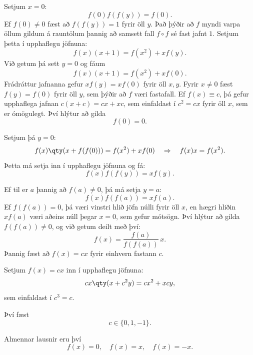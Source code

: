 Setjum $x = 0$:
\[
f(0) f(f(y)) = f(0).
\]
Ef $f(0) \neq 0$ fæst að $f(f(y)) = 1$ fyrir öll $y$.  
Það þýðir að $f$ myndi varpa öllum gildum á rauntölum þannig að samsett fall $f \circ f$ sé fast jafnt $1$.  
Setjum þetta í upphaflegu jöfnuna:
\[
f(x)(x + 1) = f(x^2) + x f(y).
\]
Við getum þá sett $y = 0$ og fáum
\[
f(x)(x + 1) = f(x^2) + x f(0).
\]
Frádráttur jafnanna gefur $x f(y) = x f(0)$ fyrir öll $x,y$. Fyrir $x \neq 0$ fæst $f(y) = f(0)$ fyrir öll $y$, sem þýðir að $f$ væri fastafall.  
Ef $f(x) \equiv c$, þá gefur upphaflega jafnan $c(x + c) = c x + x c$, sem einfaldast í $c^2 = c x$ fyrir öll $x$,  
sem er ómögulegt. Því hlýtur að gilda
\[
f(0) = 0.
\]

Setjum þá $y = 0$:
\[
f(x)\qty(x + f(f(0))) = f(x^2) + x f(0) \quad\Rightarrow\quad f(x)x = f(x^2).
\]
Þetta má setja inn í upphaflegu jöfnuna og fá:
\[
f(x) f(f(y)) = x f(y).
\]

Ef til er $a$ þannig að $f(a) \neq 0$, þá má setja $y = a$:
\[
f(x) f(f(a)) = x f(a).
\]
Ef $f(f(a)) = 0$, þá væri vinstri hlið jöfn núlli fyrir öll $x$, en hægri hliðin $x f(a)$ væri aðeins núll þegar $x = 0$,  
sem gefur mótsögn. Því hlýtur að gilda $f(f(a)) \neq 0$, og við getum deilt með því:
\[
f(x) = \frac{f(a)}{f(f(a))} \, x.
\]
Þannig fæst að $f(x) = c x$ fyrir einhvern fastann $c$.

Setjum $f(x) = c x$ inn í upphaflegu jöfnuna:
\[
c x \qty(x + c^2 y) = c x^2 + x c y,
\]
sem einfaldast í $c^3 = c$.

Því fæst
\[
c \in \{0, 1, -1\}.
\]

Almennar lausnir eru því
\[
f(x) = 0, \quad f(x) = x, \quad f(x) = -x.
\]

